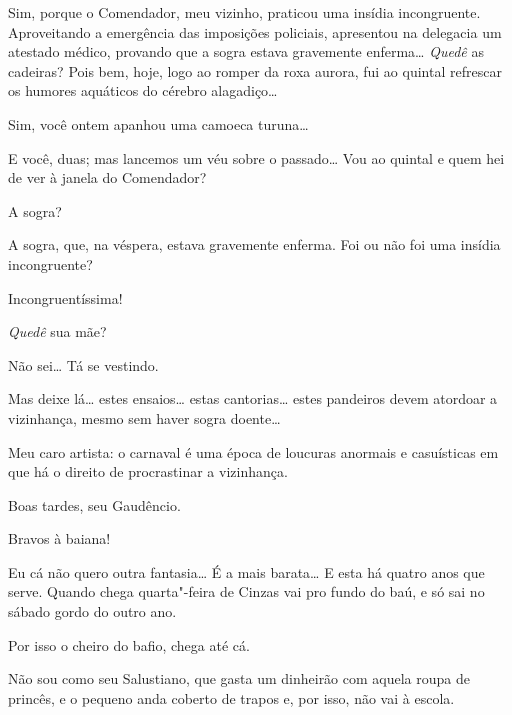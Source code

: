  Sim, porque o Comendador, meu vizinho, praticou uma
insídia incongruente.  Aproveitando a emergência das imposições policiais,
apresentou na delegacia um atestado médico, provando que a sogra estava
gravemente enferma\ldots{}  \textit{Quedê} as
cadeiras? 
  Pois bem, hoje, logo ao romper
da roxa aurora, fui ao quintal refrescar os humores aquáticos do cérebro
alagadiço\ldots{}

 Sim, você ontem apanhou uma camoeca turuna\ldots{}

 E você, duas; mas lancemos um véu sobre o passado\ldots{} Vou ao
quintal e quem hei de ver à janela do Comendador?

 A sogra?

 A sogra, que, na véspera, estava gravemente enferma. Foi
ou não foi uma insídia incongruente?

 Incongruentíssima!

  \textit{Quedê} sua mãe?

 Não sei\ldots{} Tá se vestindo. 

 Mas deixe lá\ldots{} estes ensaios\ldots{} estas cantorias\ldots{} estes
pandeiros devem atordoar a vizinhança, mesmo sem haver sogra doente\ldots{}

 Meu caro artista: o carnaval é uma época de loucuras
anormais e casuísticas em que há o direito de procrastinar a vizinhança.




  Boas tardes, seu Gaudêncio.

 Bravos à baiana!

 Eu cá não quero outra fantasia\ldots{} É a mais barata\ldots{} E
esta há quatro anos que serve. Quando chega quarta"-feira de Cinzas vai pro fundo
do baú, e só sai no sábado gordo do outro ano.

 Por isso o cheiro do bafio, chega até cá.

 Não sou como seu Salustiano, que gasta um dinheirão com
aquela roupa de princês, e o pequeno anda coberto de trapos e, por isso, não vai
à escola. 

